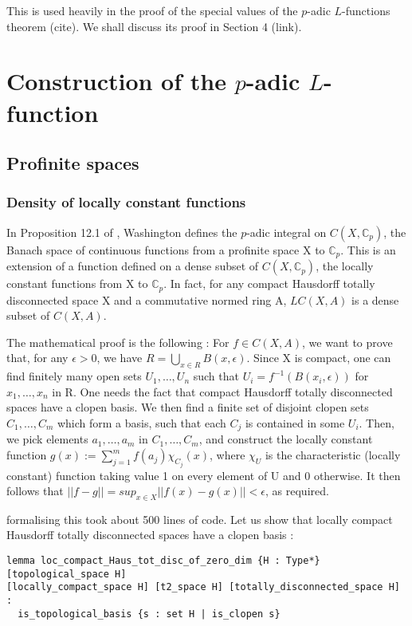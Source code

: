 \documentclass[a4paper,UKenglish,cleveref, autoref, thm-restate]{lipics-v2021}
\begin{document}
This is used heavily in the proof of the special values of the $p$-adic $L$-functions theorem (cite). 
We shall discuss its proof in Section 4 (link).

\section{Construction of the $p$-adic $L$-function}
\label{section3}
\subsection{Profinite spaces}
\subsubsection{Density of locally constant functions}
In Proposition 12.1 of \cite{cyc}, Washington defines the $p$-adic integral on $C(X, \mathbb{C}_p)$,
the Banach space of continuous functions from a profinite space X to $\mathbb{C}_p$.
This is an extension of a function defined on a dense subset of $C(X, \mathbb{C}_p)$, the
locally constant functions from X to $\mathbb{C}_p$. In fact, for any compact
Hausdorff totally disconnected space X and a commutative
normed ring A, $LC(X, A)$ is a dense subset of $C(X, A)$. 

The mathematical proof is the following : For $f \in C(X, A)$, we want to prove that,
for any $\epsilon > 0$, we have $R = \bigcup_{x \in R} B(x, \epsilon)$. Since X is compact,
one can find finitely many open sets $U_1, \dots, U_n$ such that $U_i = f^{-1}(B(x_i, \epsilon))$
for $x_1, \dots, x_n$ in R. One needs the fact that compact Hausdorff totally disconnected spaces
have a clopen basis. We then find a finite set of disjoint clopen sets $C_1, \dots, C_m$ which form
a basis, such that each $C_j$ is contained in some $U_i$.
Then, we pick elements $a_1, \dots, a_m$ in $C_1, \dots, C_m$, and construct the locally constant
function $g(x) := \sum_{j = 1}^m f(a_j) \chi_{C_j}(x)$, where $\chi_U$ is the characteristic
(locally constant) function taking value 1 on every element of U and 0 otherwise. It then follows
that $|| f - g || = sup_{x \in X} ||f(x) - g(x)|| < \epsilon$, as required. 

formalising this took about 500 lines of code. Let us show that locally compact Hausdorff
totally disconnected spaces have a clopen basis :

\begin{lstlisting}
lemma loc_compact_Haus_tot_disc_of_zero_dim {H : Type*} [topological_space H] 
[locally_compact_space H] [t2_space H] [totally_disconnected_space H] :
  is_topological_basis {s : set H | is_clopen s}
\end{lstlisting}
\end{document}

